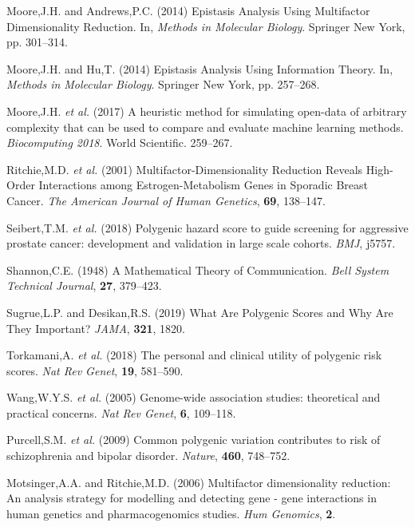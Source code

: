 \documentclass[a4paper,twoside, 9pt]{article}
\begin{document}
\leavevmode\hypertarget{ref-1BqLrlGsj}{}%
Moore,J.H. and Andrews,P.C. (2014) Epistasis Analysis Using Multifactor
Dimensionality Reduction. In, \emph{Methods in Molecular Biology}.
Springer New York, pp. 301--314.

\leavevmode\hypertarget{ref-1FFMLUZxb}{}%
Moore,J.H. and Hu,T. (2014) Epistasis Analysis Using Information Theory.
In, \emph{Methods in Molecular Biology}. Springer New York, pp.
257--268.

\leavevmode\hypertarget{ref-pDXdtMFa}{}%
Moore,J.H. \emph{et al.} (2017) A heuristic method for simulating
open-data of arbitrary complexity that can be used to compare and
evaluate machine learning methods. \emph{Biocomputing 2018}. World Scientific. 259--267.

\leavevmode\hypertarget{ref-E26QhGxD}{}%
Ritchie,M.D. \emph{et al.} (2001) Multifactor-Dimensionality Reduction
Reveals High-Order Interactions among Estrogen-Metabolism Genes in
Sporadic Breast Cancer. \emph{The American Journal of Human Genetics},
\textbf{69}, 138--147.

\leavevmode\hypertarget{ref-gkABDVTx}{}%
Seibert,T.M. \emph{et al.} (2018) Polygenic hazard score to guide
screening for aggressive prostate cancer: development and validation in
large scale cohorts. \emph{BMJ}, j5757.

\leavevmode\hypertarget{ref-yzGboP1g}{}%
Shannon,C.E. (1948) A Mathematical Theory of Communication. \emph{Bell
System Technical Journal}, \textbf{27}, 379--423.

\leavevmode\hypertarget{ref-1Dlv3tAGh}{}%
Sugrue,L.P. and Desikan,R.S. (2019) What Are Polygenic Scores and Why
Are They Important? \emph{JAMA}, \textbf{321}, 1820.

\leavevmode\hypertarget{ref-1GK3F1BxE}{}%
Torkamani,A. \emph{et al.} (2018) The personal and clinical utility of
polygenic risk scores. \emph{Nat Rev Genet}, \textbf{19}, 581--590.

\leavevmode\hypertarget{ref-12kQ0EOWQ}{}%
Wang,W.Y.S. \emph{et al.} (2005) Genome-wide association studies:
theoretical and practical concerns. \emph{Nat Rev Genet}, \textbf{6},
109--118.

\leavevmode\hypertarget{ref-mwTa2RUK}{}%
Purcell,S.M. \emph{et al.} (2009) Common polygenic variation contributes to risk of schizophrenia
and bipolar disorder. \emph{Nature}, \textbf{460}, 748--752.

\leavevmode\hypertarget{ref-motsinger}{}
Motsinger,A.A. and Ritchie,M.D. (2006) Multifactor dimensionality reduction: An analysis strategy for modelling and detecting gene - gene interactions in human genetics and pharmacogenomics studies. 
\emph{Hum Genomics}, \textbf{2}.
\end{document}
